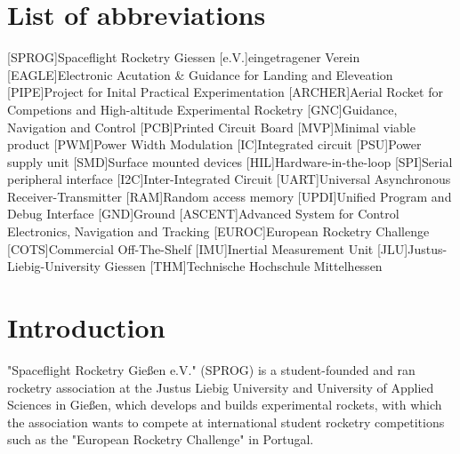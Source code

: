 \documentclass[fontsize=11pt,%
twoside,%
BCOR          = 8mm, %
DIV           = 11,  %
titlepage     = off,%
index=totoc,%
xcolor        = pdftex,%
dvipsnames,%
bibliography  = totoc,%
bibliography = numbered, %
listof        = notnumbered]{scrreprt}
\begin{document}
\newpage
\tableofcontents
\cleardoublepage

\listoffigures
\cleardoublepage

\listoftables
\cleardoublepage

\chapter*{List of abbreviations}
	\begin{acronym}
		[SPROG]{\dotfill Spaceflight Rocketry Giessen}
		{\dotfill eingetragener Verein}
		[EAGLE]{\dotfill Electronic Acutation \& Guidance for Landing and Eleveation}
		{\dotfill Project for Inital Practical Experimentation}
		[ARCHER]{\dotfill Aerial Rocket for Competions and High-altitude Experimental Rocketry}
		[GNC]{\dotfill Guidance, Navigation and Control}
		[PCB]{\dotfill Printed Circuit Board}
		[MVP]{\dotfill Minimal viable product}
		[PWM]{\dotfill Power Width Modulation}
		[IC]{\dotfill Integrated circuit}
		[PSU]{\dotfill Power supply unit}
		[SMD]{\dotfill Surface mounted devices}
		[HIL]{\dotfill Hardware-in-the-loop}
		[SPI]{\dotfill Serial peripheral interface}
		[I2C]{\dotfill Inter-Integrated Circuit}
		{\dotfill Universal Asynchronous Receiver-Transmitter}
		[RAM]{\dotfill Random access memory}
		{\dotfill Unified Program and Debug Interface}
		[GND]{\dotfill Ground}
		[ASCENT]{\dotfill Advanced System for Control Electronics, Navigation and Tracking}
		[EUROC]{\dotfill European Rocketry Challenge}
		{\dotfill Commercial Off-The-Shelf}
		[IMU]{\dotfill Inertial Measurement Unit}
		[JLU]{\dotfill Justus-Liebig-University Giessen}
		[THM]{\dotfill Technische Hochschule Mittelhessen}
	\end{acronym}
	\cleardoublepage




\setcounter{page}{1}

\chapter{Introduction}
"Spaceflight Rocketry Gießen e.V." (SPROG) is a student-founded and ran rocketry association at the Justus Liebig University and University of Applied Sciences in Gießen, which develops and builds experimental rockets, with which the association wants to compete at international student rocketry competitions such as the "European Rocketry Challenge" in Portugal.
\end{document}
